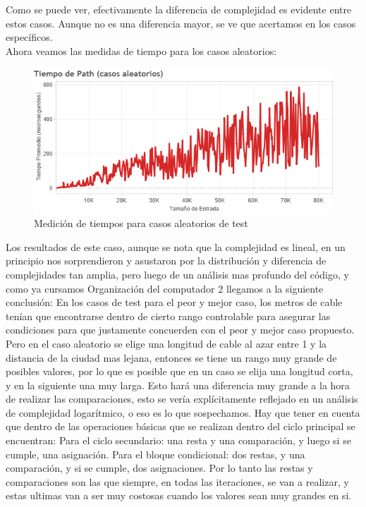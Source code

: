 \documentclass{article}
\theoremstyle{definition}
\theoremstyle{remark}
\begin{document}
Como se puede ver, efectivamente la diferencia de complejidad es evidente entre estos casos. Aunque no es una diferencia mayor, se ve que acertamos en los casos específicos.\\

Ahora veamos las medidas de tiempo para los casos aleatorios:

\begin{figure}[h!]
\centering
\includegraphics[width=15cm]{docs/images/ex1-random.png}
\caption{Medición de tiempos para casos aleatorios de test}
\label{exp1plot}
\end{figure}

Los resultados de este caso, aunque se nota que la complejidad es lineal, en un principio nos sorprendieron y asustaron por la distribución y diferencia de complejidades tan amplia, pero luego de un análisis mas profundo del código, y como ya cursamos Organización del computador 2 llegamos a la siguiente conclusión: En los casos de test para el peor y mejor caso, los metros de cable tenían que encontrarse dentro de cierto rango controlable para asegurar las condiciones para que justamente concuerden con el peor y mejor caso propuesto. Pero en el caso aleatorio se elige una longitud de cable al azar entre 1 y la distancia de la ciudad mas lejana, entonces se tiene un rango muy grande de posibles valores, por lo que es posible que en un caso se elija una longitud corta, y en la siguiente una muy larga. Esto hará una diferencia muy grande a la hora de realizar las comparaciones, esto se vería explícitamente reflejado en un análisis de complejidad logarítmico, o eso es lo que sospechamos. Hay que tener en cuenta que dentro de las operaciones básicas que se realizan dentro del ciclo principal se encuentran:
Para el ciclo secundario: una resta y una comparación, y luego si se cumple, una asignación.
Para el bloque condicional: dos restas, y una comparación, y si se cumple, dos asignaciones.
Por lo tanto las restas y comparaciones son las que siempre, en todas las iteraciones, se van a realizar, y estas ultimas van a ser muy costosas cuando los valores sean muy grandes en si.
\end{document}
